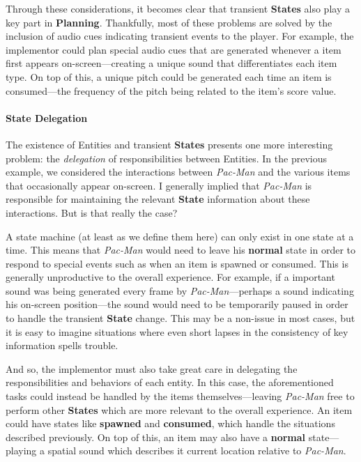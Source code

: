 \documentclass{report}
\newcommand{\plan}{\textbf{Planning}\xspace}
\newcommand{\state}[1]{\textbf{#1}}
\newcommand{\imp}{implementor\xspace}
\begin{document}
Through these considerations, it becomes clear that transient \state{States} also play a key part in \plan. Thankfully, most of these problems are solved by the inclusion of audio cues indicating transient events to the player. For example, the \imp could plan special audio cues that are generated whenever a item first appears on-screen---creating a unique sound that differentiates each item type. On top of this, a unique pitch could be generated each time an item is consumed---the frequency of the pitch being related to the item's score value. 

\paragraph{State Delegation}
The existence of Entities and transient \state{States} presents one more interesting problem: the \emph{delegation} of responsibilities between Entities. In the previous example, we considered the interactions between \emph{Pac-Man} and the various items that occasionally appear on-screen. I generally implied that \emph{Pac-Man} is responsible for maintaining the relevant \state{State} information about these interactions. But is that really the case?

A state machine (at least as we define them here) can only exist in one state at a time. This means that \emph{Pac-Man} would need to leave his \state{normal} state in order to respond to special events such as when an item is spawned or consumed. This is generally unproductive to the overall experience. For example, if a important sound was being generated every frame by \emph{Pac-Man}---perhaps a sound indicating his on-screen position---the sound would need to be temporarily paused in order to handle the transient \state{State} change. This may be a non-issue in most cases, but it is easy to imagine situations where even short lapses in the consistency of key information spells trouble. 

And so, the \imp must also take great care in delegating the responsibilities and behaviors of each entity. In this case, the aforementioned tasks could instead be handled by the items themselves---leaving \emph{Pac-Man} free to perform other \state{States} which are more relevant to the overall experience. An item could have states like \state{spawned} and \state{consumed}, which handle the situations described previously. On top of this, an item may also have a \state{normal} state---playing a spatial sound which describes it current location relative to \emph{Pac-Man}.
\end{document}
